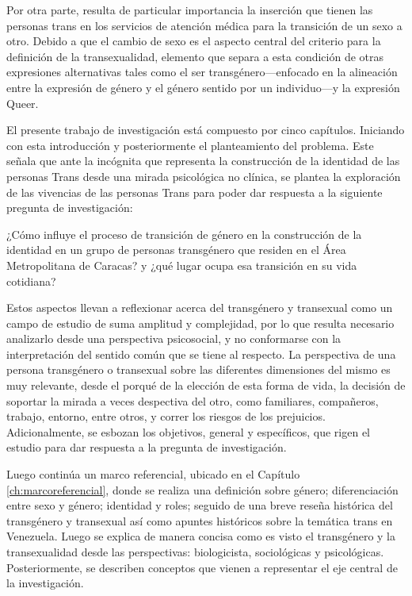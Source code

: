 Por otra parte, resulta de particular importancia la inserción que tienen las
personas trans en los servicios de atención médica para la transición de un sexo
a otro.
Debido a que el cambio de sexo es el aspecto central del criterio para la
definición de la transexualidad, elemento que separa a esta condición de otras
expresiones alternativas tales como el ser transgénero—enfocado en la
alineación entre la expresión de género y el género sentido por un individuo—y
la expresión Queer.

El presente trabajo de investigación está compuesto por cinco capítulos.
Iniciando con esta introducción y posteriormente el planteamiento del problema.
Este señala que ante la incógnita que representa la construcción de la identidad
de las personas Trans desde una mirada psicológica no clínica, se plantea la
exploración de las vivencias de las personas Trans para poder dar respuesta a la
siguiente pregunta de investigación:

¿Cómo influye el proceso de transición de género en la construcción de la
identidad en un grupo de personas transgénero que residen en el Área
Metropolitana de Caracas? y ¿qué lugar ocupa esa transición en su vida cotidiana?

Estos aspectos llevan a reflexionar acerca del transgénero y transexual como un
campo de estudio de suma amplitud y complejidad, por lo que resulta necesario
analizarlo desde una perspectiva psicosocial, y no conformarse con la
interpretación del sentido común que se tiene al respecto.
La perspectiva de una persona transgénero o transexual sobre las diferentes
dimensiones del mismo es muy relevante, desde el porqué de la elección de esta
forma de vida, la decisión de soportar la mirada a veces despectiva del otro,
como familiares, compañeros, trabajo, entorno, entre otros, y correr los
riesgos de los prejuicios.
Adicionalmente, se esbozan los objetivos, general y específicos, que rigen el
estudio para dar respuesta a la pregunta de investigación.

Luego continúa un marco referencial, ubicado en el
Capítulo \ref{ch:marcoreferencial}, donde se realiza una definición
sobre género;
diferenciación entre sexo y género;
identidad y roles;
seguido de una breve reseña histórica del transgénero y transexual así como
apuntes históricos sobre la temática trans en Venezuela.
Luego se explica de manera concisa como es visto el transgénero y la
transexualidad desde las perspectivas: biologicista, sociológicas y
psicológicas.
Posteriormente, se describen conceptos que vienen a representar el eje central
de la investigación.

